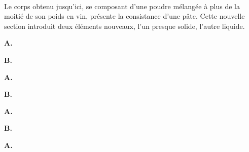 \documentclass[a4paper, 11pt, oneside]{article}
\newcommand*\hieroAAAE{}
\newcommand*\hieroAAAM{}
\newcommand*\hieroAAAN{}
\newcommand*\hieroAAAR{}
\newcommand*\hieroAACQ{}
\newcommand*\hieroAADL{}
\newcommand*\hieroAAEP{\raisebox{0.5ex}{}}
\newcommand*\hieroAAFT{}
\newcommand*\hieroAAGA{}
\newcommand*\hieroAAGN{}
\newcommand*\hieroAAGP{}
\newcommand*\hieroAAHC{\raisebox{1ex}{}}
\newcommand*\hieroAAIE{}
\newcommand*\hieroAAIG{}
\newcommand*\hieroAAIT{}
\newcommand*\hieroAAIU{}
\newcommand*\hieroAAJI{}
\newcommand*\hieroAALO{}
\newcommand*\hieroAALP{}
\newcommand*\hieroAAMQ{}
\newcommand*\hieroAANF{}
\newcommand*\hieroAANN{}
\newcommand*\hieroAANO{}
\newcommand*\hieroAANP{}
\newcommand*\hieroAANQ{}
\newcommand*\hieroAANR{}
\newcommand*\hieroAANS{}
\newcommand*\hieroAANT{}
\newcommand*\hieroAANU{}
\newcommand*\hieroAANV{}
\newcommand*\hieroAANW{}
\newcommand*\hieroAANX{}
\newcommand*\hieroAANY{}
\newcommand*\hieroAANZ{}
\newcommand*\hieroAAOA{}
\newcommand*\hieroAAOB{}
\newcommand*\hieroAAOC{}
\newcommand*\hieroAAOD{}
\newcommand*\hieroAAOE{\raisebox{0.6ex}{}}
\newcommand*\hieroAAOI{}
\newcommand*\hieroAAOJ{}
\newcommand*\hieroAAOK{}
\newcommand*\hieroAAOL{}
\newcommand*\hieroAAOM{}
\newcommand*\hieroAAON{}
\newcommand*\hieroAAOO{}
\newcommand*\hieroAAOP{}
\newcommand*\hieroAAOQ{}
\newcommand*\hieroAAOR{}
\newcommand*\hieroAAOS{}
\newcommand*\hieroAAOT{}
\newcommand*\hieroAAOU{}
\newcommand*\hieroAAOV{}
\begin{document}
\paragraph{}
Le corps obtenu jusqu'ici, se composant d'une poudre mélangée à plus de la moitié de son poids en vin, présente la consistance d'une pâte. Cette nouvelle section introduit deux éléments nouveaux, l'un presque solide, l'autre liquide.

\hspace*{10mm}\textbf{A.}\hspace*{5mm} $\hieroAANN\:\hieroAAAN\:\hieroAANO\:\hieroAANO\:\hieroAANP\:\hieroAANQ\:\hieroAANF\:\hieroAAIG\:\hieroAAIT\:\hieroAAMQ$ \hspace*{7mm} $\hieroAANR\:\hieroAANS\:\hieroAAHC\:\hieroAALO$

\hspace*{10mm}\textbf{B.}\hspace*{5mm} $\hieroAAAM\:\hieroAANT\:\hieroAANU\:\hieroAANV\:\hieroAANW\:\hieroAANQ\:\hieroAANF\:\hieroAAIG\:\hieroAAGN\:\hieroAAFT\:\hieroAAMQ$ \hspace*{5mm} $\hieroAANR\:\hieroAANX\:\hieroAANS\:\hieroAALO$

\hspace*{10mm}\textbf{A.}\hspace*{5mm} $\hieroAAIT\:\hieroAAIU\:\hieroAANY\:\hieroAAIT\:\hieroAAMQ\:\hieroAALP$ \hspace*{8mm} $\hieroAAGP\:\hieroAANZ\:\hieroAAOA\:\hieroAAOB\:\hieroAAOC\:\hieroAAOD\:\hieroAAOE$

\hspace*{10mm}\textbf{B.}\hspace*{5mm} $\hieroAAGN\:\hieroAAFT\:\hieroAALP\:\hieroAAGN\:\hieroAAFT\:\hieroAAMQ\:\hieroAALP$

\hspace*{10mm}\textbf{A.}\hspace*{5mm} $\hieroAAOI\:\hieroAAOJ\:\hieroAAOK\:\hieroAAOL\:\hieroAAIT\:\hieroAAIE\:\hieroAACQ\:\hieroAAIG\:\hieroAAOM\:\hieroAAAE\:\hieroAAAR\:\hieroAAIT\:\hieroAAON\:\hieroAAGN$

\hspace*{10mm}\textbf{B.}\hspace*{5mm} $\hieroAAJI\:\hieroAAEP\:\hieroAAOO\:\hieroAAOP\:\hieroAAAM\:\hieroAAAM\:\hieroAADL\:\hieroAAOQ\:\hieroAANQ\:\hieroAAIE\:\hieroAACQ\:\hieroAAIG\:\hieroAAOR\:\hieroAAOS\:\hieroAAOT\:\hieroAAON$

\hspace*{10mm}\textbf{A.}\hspace*{5mm} $\hieroAAAE\:\hieroAAAR\:\hieroAAOU\:\hieroAAMQ\:\hieroAAIU\:\hieroAAGA\:\hieroAAOV$
\end{document}
